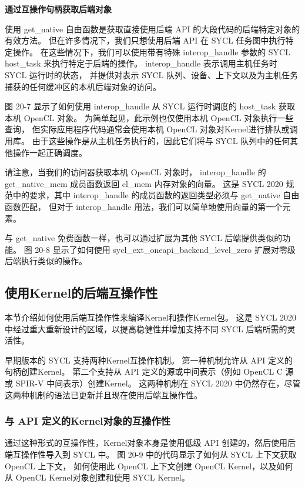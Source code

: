 \textbf{通过互操作句柄获取后端对象}

使用 get\_native 自由函数是获取直接使用后端 API 的大段代码的后端特定对象的有效方法。 
但在许多情况下，我们只想使用后端 API 在 SYCL 任务图中执行特定操作。 
在这些情况下，我们可以使用带有特殊 interop\_handle 参数的 SYCL host\_task 来执行特定于后端的操作。 
interop\_handle 表示调用主机任务时 SYCL 运行时的状态，
并提供对表示 SYCL 队列、设备、上下文以及为主机任务捕获的任何缓冲区的本机后端对象的访问。

图 20-7 显示了如何使用 interop\_handle 从 SYCL 运行时调度的 host\_task 获取本机 OpenCL 对象。 
为简单起见，此示例也仅使用本机 OpenCL 对象执行一些查询，
但实际应用程序代码通常会使用本机 OpenCL 对象对Kernel进行排队或调用库。 
由于这些操作是从主机任务执行的，因此它们将与 SYCL 队列中的任何其他操作一起正确调度。

请注意，当我们的访问器获取本机 OpenCL 对象时，
interop\_handle 的 get\_native\_mem 成员函数返回 cl\_mem 内存对象的向量。 
这是 SYCL 2020 规范中的要求，其中 interop\_handle 的成员函数的返回类型必须与 get\_native 自由函数匹配，
但对于 interop\_handle 用法，我们可以简单地使用向量的第一个元素。

与 get\_native 免费函数一样，也可以通过扩展为其他 SYCL 后端提供类似的功能。 
图 20-8 显示了如何使用 sycl\_ext\_oneapi\_backend\_level\_zero 扩展对零级后端执行类似的操作。

\subsection{使用Kernel的后端互操作性}
本节介绍如何使用后端互操作性来编译Kernel和操作Kernel包。 
这是 SYCL 2020 中经过重大重新设计的区域，以提高稳健性并增加支持不同 SYCL 后端所需的灵活性。

早期版本的 SYCL 支持两种Kernel互操作机制。 第一种机制允许从 API 定义的句柄创建Kernel。 
第二个支持从 API 定义的源或中间表示（例如 OpenCL C 源或 SPIR-V 中间表示）创建Kernel。 
这两种机制在 SYCL 2020 中仍然存在，尽管这两种机制的语法已更新并且现在使用后端互操作性。

\subsubsection{与 API 定义的Kernel对象的互操作性}
通过这种形式的互操作性，Kernel对象本身是使用低级 API 创建的，然后使用后端互操作性导入到 SYCL 中。 
图 20-9 中的代码显示了如何从 SYCL 上下文获取 OpenCL 上下文，
如何使用此 OpenCL 上下文创建 OpenCL Kernel，以及如何从 OpenCL Kernel对象创建和使用 SYCL Kernel。

